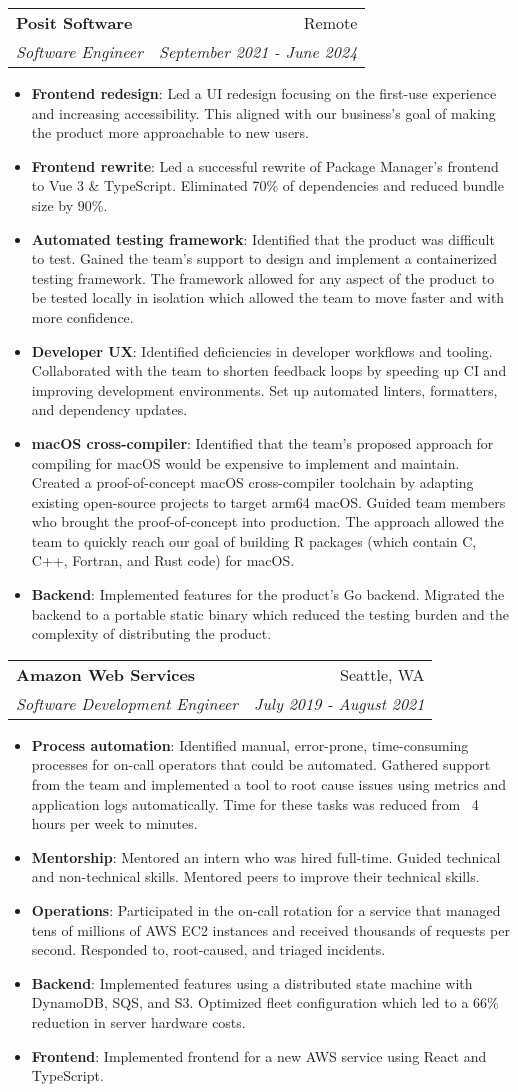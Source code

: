 \documentclass[letterpaper,11pt]{article}
\makeatletter
\newcommand{\resumeItem}[2]{
  \item\small{
    \textbf{#1}{: #2 \vspace{-2pt}}
  }
}
\newcommand{\resumeSubheading}[4]{
  \vspace{-1pt}\item
    \begin{tabular*}{0.97\textwidth}[t]{l@{\extracolsep{\fill}}r}
      \textbf{#1} & #2 \\
      \textit{\small#3} & \textit{\small #4} \\
    \end{tabular*}\vspace{-5pt}
}
\newcommand{\resumeItemListStart}{\begin{itemize}}
\newcommand{\resumeItemListEnd}{\end{itemize}\vspace{-5pt}}
\makeatother
\begin{document}
    \resumeSubheading
      {Posit Software}{Remote}
      {Software Engineer}{September 2021 - June 2024}
      \resumeItemListStart
        \resumeItem{Frontend redesign}{Led a UI redesign focusing on the first-use experience and increasing accessibility. This aligned with our business's goal of making the product more approachable to new users.}
        \resumeItem{Frontend rewrite}{Led a successful rewrite of Package Manager's frontend to Vue 3 \& TypeScript. Eliminated 70\% of dependencies and reduced bundle size by 90\%.}
        \resumeItem{Automated testing framework}{Identified that the product was difficult to test. Gained the team's support to design and implement a containerized testing framework. The framework allowed for any aspect of the product to be tested locally in isolation which allowed the team to move faster and with more confidence.}
        \resumeItem{Developer UX}{Identified deficiencies in developer workflows and tooling. Collaborated with the team to shorten feedback loops by speeding up CI and improving development environments. Set up automated linters, formatters, and dependency updates.}
        \resumeItem{macOS cross-compiler}{Identified that the team's proposed approach for compiling for macOS would be expensive to implement and maintain. Created a proof-of-concept macOS cross-compiler toolchain by adapting existing open-source projects to target arm64 macOS. Guided team members who brought the proof-of-concept into production. The approach allowed the team to quickly reach our goal of building R packages (which contain C, C++, Fortran, and Rust code) for macOS.}
        \resumeItem{Backend}{Implemented features for the product's Go backend. Migrated the backend to a portable static binary which reduced the testing burden and the complexity of distributing the product.}
      \resumeItemListEnd

    \resumeSubheading
      {Amazon Web Services}{Seattle, WA}
      {Software Development Engineer}{July 2019 - August 2021}
      \resumeItemListStart
        \resumeItem{Process automation}{Identified manual, error-prone, time-consuming processes for on-call operators that could be automated. Gathered support from the team and implemented a tool to root cause issues using metrics and application logs automatically. Time for these tasks was reduced from ~4 hours per week to minutes.}
        \resumeItem{Mentorship}{Mentored an intern who was hired full-time. Guided technical and non-technical skills. Mentored peers to improve their technical skills.}
        \resumeItem{Operations}{Participated in the on-call rotation for a service that managed tens of millions of AWS EC2 instances and received thousands of requests per second. Responded to, root-caused, and triaged incidents.}
        \resumeItem{Backend}{Implemented features using a distributed state machine with DynamoDB, SQS, and S3. Optimized fleet configuration which led to a 66\% reduction in server hardware costs.}
        \resumeItem{Frontend}{Implemented frontend for a new AWS service using React and TypeScript.}
        \resumeItemListEnd
\end{document}
